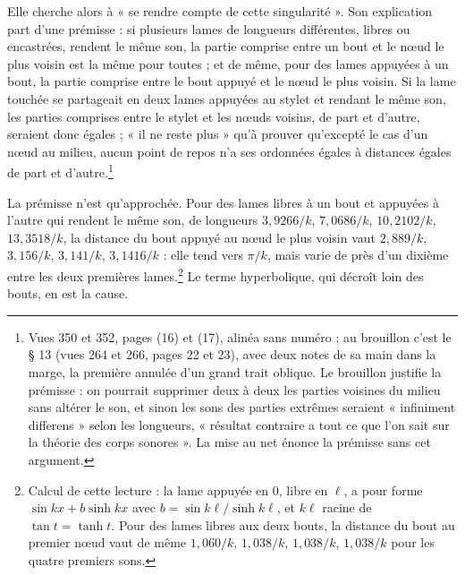 \documentclass[11pt,a4paper]{article}
\begin{document}
Elle cherche alors à « se rendre compte de cette singularité ». Son explication part d'une prémisse : si plusieurs lames de longueurs différentes, libres ou encastrées, rendent le même son, la partie comprise entre un bout et le nœud le plus voisin est la même pour toutes ; et de même, pour des lames appuyées à un bout, la partie comprise entre le bout appuyé et le nœud le plus voisin. Si la lame touchée se partageait en deux lames appuyées au stylet et rendant le même son, les parties comprises entre le stylet et les nœuds voisins, de part et d'autre, seraient donc égales ; « il ne reste plus » qu'à prouver qu'excepté le cas d'un nœud au milieu, aucun point de repos n'a ses ordonnées égales à distances égales de part et d'autre.\footnote{Vues 350 et 352, pages (16) et (17), alinéa sans numéro ; au brouillon c'est le § 13 (vues 264 et 266, pages 22 et 23), avec deux notes de sa main dans la marge, la première annulée d'un grand trait oblique. Le brouillon justifie la prémisse : on pourrait supprimer deux à deux les parties voisines du milieu sans altérer le son, et sinon les sons des parties extrêmes seraient « infiniment differens » selon les longueurs, « résultat contraire a tout ce que l'on sait sur la théorie des corps sonores ». La mise au net énonce la prémisse sans cet argument.}

La prémisse n'est qu'approchée. Pour des lames libres à un bout et appuyées à l'autre qui rendent le même son, de longueurs $3{,}9266/k$, $7{,}0686/k$, $10{,}2102/k$, $13{,}3518/k$, la distance du bout appuyé au nœud le plus voisin vaut $2{,}889/k$, $3{,}156/k$, $3{,}141/k$, $3{,}1416/k$ : elle tend vers $\pi/k$, mais varie de près d'un dixième entre les deux premières lames.\footnote{Calcul de cette lecture : la lame appuyée en $0$, libre en $\ell$, a pour forme $\sin kx+b\sinh kx$ avec $b=\sin k\ell/\sinh k\ell$, et $k\ell$ racine de $\tan t=\tanh t$. Pour des lames libres aux deux bouts, la distance du bout au premier nœud vaut de même $1{,}060/k$, $1{,}038/k$, $1{,}038/k$, $1{,}038/k$ pour les quatre premiers sons.} Le terme hyperbolique, qui décroît loin des bouts, en est la cause.
\end{document}
